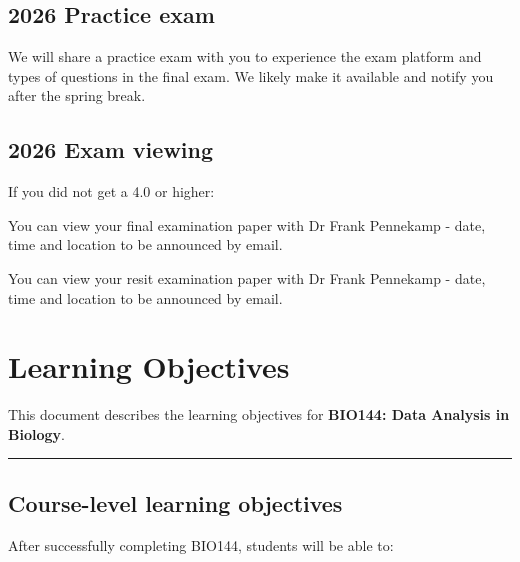 \documentclass[
  letterpaper,
  8pt,
  a4paper]{book}
\begin{document}
\section*{2026 Practice exam}\label{practice-exam}


We will share a practice exam with you to experience the exam platform
and types of questions in the final exam. We likely make it available
and notify you after the spring break.

\section*{2026 Exam viewing}\label{exam-viewing}


If you did not get a 4.0 or higher:

You can view your final examination paper with Dr Frank Pennekamp -
date, time and location to be announced by email.

You can view your resit examination paper with Dr Frank Pennekamp -
date, time and location to be announced by email.


\chapter*{Learning Objectives}\label{learning-objectives}


This document describes the learning objectives for \textbf{BIO144: Data
Analysis in Biology}.

\begin{center}\rule{0.5\linewidth}{0.5pt}\end{center}

\section*{Course-level learning
objectives}\label{course-level-learning-objectives}


After successfully completing BIO144, students will be able to:
\end{document}
